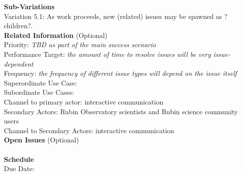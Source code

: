 {\bf Sub-Variations} \\
Variation 5.1: As work proceeds, new (related) issues may be spawned as ?children?. \\

{\bf Related Information} (Optional) \\
Priority: {\it TBD as part of the main success scenario} \\
Performance Target: {\it the amount of time to resolve issues will be very issue-dependent} \\
Frequency: {\it  the frequency of different issue types will depend on the issue itself} \\
Superordinate Use Case:  \\
Subordinate Use Cases: \\
Channel to primary actor:  interactive communication \\
Secondary Actors: Rubin Observatory scientists and Rubin science community users \\
Channel to Secondary Actors: interactive communication \\

{\bf Open Issues} (Optional) \\
 \\

{\bf Schedule} \\
Due Date: \\
